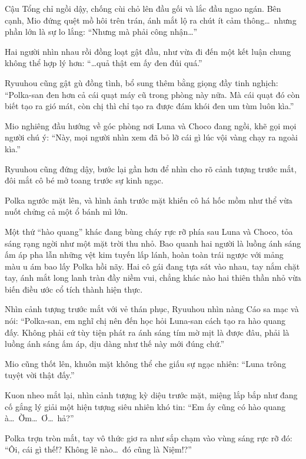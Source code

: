 \documentclass[../main.tex]{subfiles}
\begin{document}
Cậu Tổng chỉ ngồi dậy, chống cùi chỏ lên đầu gối và lắc đầu ngao ngán. Bên cạnh, Mio đứng quệt mồ hôi trên trán, ánh mắt lộ ra chút ít cảm thông\dots\ nhưng phần lớn là sự lo lắng: ``Nhưng mà phải công nhận\dots''

Hai người nhìn nhau rồi đồng loạt gật đầu, như vừa đi đến một kết luận chung không thể hợp lý hơn: ``\dots quả thật em ấy đen đủi quá.''

Ryuuhou cũng gật gù đồng tình, bổ sung thêm bằng giọng đầy tinh nghịch: ``Polka-san đen hơn cả cái quạt máy cũ trong phòng này nữa. Mà cái quạt đó còn biết tạo ra gió mát, còn chị thì chỉ tạo ra được đám khói đen um tùm luôn kìa.''

Mio nghiêng đầu hướng về góc phòng nơi Luna và Choco đang ngồi, khẽ gọi mọi người chú ý: ``Này, mọi người nhìn xem đã bỏ lỡ cái gì lúc vội vàng chạy ra ngoài kìa.''

Ryuuhou cũng đứng dậy, bước lại gần hơn để nhìn cho rõ cảnh tượng trước mắt, đôi mắt cô bé mở toang trước sự kinh ngạc.

Polka ngước mặt lên, và hình ảnh trước mặt khiến cô há hốc mồm như thể vừa nuốt chửng cả một ổ bánh mì lớn.

Một thứ ``hào quang'' khác đang bùng cháy rực rỡ phía sau Luna và Choco, tỏa sáng rạng ngời như một mặt trời thu nhỏ. Bao quanh hai người là luồng ánh sáng ấm áp pha lẫn những vệt kim tuyến lấp lánh, hoàn toàn trái ngược với mảng màu u ám bao lấy Polka hồi nãy. Hai cô gái đang tựa sát vào nhau, tay nắm chặt tay, ánh mắt long lanh tràn đầy niềm vui, chẳng khác nào hai thiên thần nhỏ vừa biến điều ước cổ tích thành hiện thực.


Nhìn cảnh tượng trước mắt với vẻ thán phục, Ryuuhou nhìn nàng Cáo sa mạc và nói: ``Polka-san, em nghĩ chị nên đến học hỏi Luna-san cách tạo ra hào quang đấy. Không phải cứ tùy tiện phát ra ánh sáng tím mờ mịt là được đâu, phải là luồng ánh sáng ấm áp, dịu dàng như thế này mới đúng chứ.''

Mio cũng thốt lên, khuôn mặt không thể che giấu sự ngạc nhiên: ``Luna trông tuyệt vời thật đấy.''

Kuon nheo mắt lại, nhìn cảnh tượng kỳ diệu trước mặt, miệng lắp bắp như đang cố gắng lý giải một hiện tượng siêu nhiên khó tin: ``Em ấy cũng có hào quang à\dots\ Ờm\dots\ Ơ\dots\ hả?''

Polka trợn tròn mắt, tay vô thức giơ ra như sắp chạm vào vùng sáng rực rỡ đó: ``Ôi, cái gì thế!? Không lẽ nào\dots\ đó cũng là Niệm!?''
\end{document}
